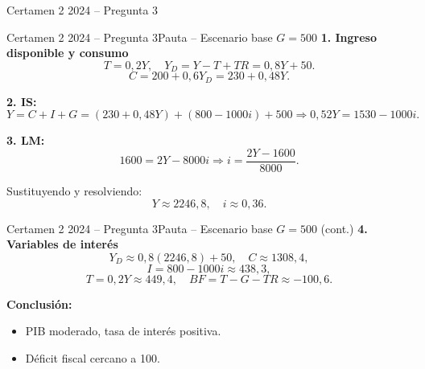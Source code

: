 \documentclass[aspectratio=169]{beamer}
\begin{document}
\begin{frame}{Certamen 2 2024 -- Pregunta 3}
  \vfill
  \centering
  \vfill
\end{frame}

\begin{frame}{Certamen 2 2024 -- Pregunta 3}{Pauta -- Escenario base $G=500$}
\small
\textbf{1. Ingreso disponible y consumo}
\[
T = 0{,}2Y,\quad Y_D = Y - T + TR = 0{,}8Y + 50.
\]
\[
C = 200 + 0{,}6Y_D = 230 + 0{,}48Y.
\]

\textbf{2. IS:}
\[
Y = C + I + G = (230 + 0{,}48Y) + (800 - 1000i) + 500
\Rightarrow 0{,}52Y = 1530 - 1000i.
\]

\textbf{3. LM:}
\[
1600 = 2Y - 8000i \Rightarrow i = \frac{2Y - 1600}{8000}.
\]

Sustituyendo y resolviendo:
\[
Y \approx 2246{,}8,\quad i \approx 0{,}36.
\]
\end{frame}

\begin{frame}{Certamen 2 2024 -- Pregunta 3}{Pauta -- Escenario base $G=500$ (cont.)}
\small
\textbf{4. Variables de interés}
\[
Y_D \approx 0{,}8(2246{,}8) + 50,\quad
C \approx 1308{,}4,
\]
\[
I = 800 - 1000i \approx 438{,}3,
\]
\[
T = 0{,}2Y \approx 449{,}4,\quad
BF = T - G - TR \approx -100{,}6.
\]

\textbf{Conclusión:}
\begin{itemize}
  \item PIB moderado, tasa de interés positiva.
  \item Déficit fiscal cercano a 100.
\end{itemize}
\end{frame}

\end{document}
